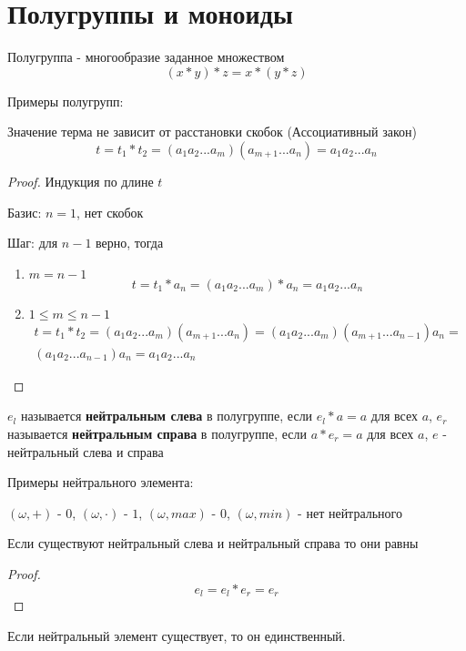 \documentclass[../main/document.tex]{subfiles}
\begin{document}
\section{Полугруппы и моноиды}
\begin{dfn}
Полугруппа - многообразие заданное множеством
$$(x*y)*z=x*(y*z)$$
\end{dfn}
\begin{exm}
Примеры полугрупп:
\end{exm}
\begin{thm}
Значение терма не зависит от расстановки скобок (Ассоциативный закон)
$$t=t_1*t_2=(a_{1}a_{2}...a_{m})(a_{m+1}...a_n)=a_{1}a_{2}...a_{n}$$
\begin{proof}
Индукция по длине $t$

Базис: $n=1$, нет скобок

Шаг: для $n-1$ верно, тогда
\begin{enumerate}
\item $m=n-1$
$$t=t_1*a_n=(a_{1}a_{2}...a_{m})*a_n=a_{1}a_{2}...a_{n}$$
\item $1\leq m\leq n-1$
\begin{multline*}
t=t_1*t_2=(a_{1}a_{2}...a_{m})(a_{m+1}...a_n)=(a_{1}a_{2}...a_{m})(a_{m+1}...a_{n-1})a_n=\\
(a_{1}a_{2}...a_{n-1})a_n=a_{1}a_{2}...a_{n}
\end{multline*}
\end{enumerate}
\end{proof}
\end{thm}
\begin{dfn}
$e_l$ называется \textbf{нейтральным слева} в полугруппе, если $e_l*a=a$ для всех $a$,
$e_r$ называется \textbf{нейтральным справа} в полугруппе, если $a*e_r=a$ для всех $a$,
$e$ - нейтральный слева и справа
\end{dfn}
\begin{exm}
Примеры нейтрального элемента:

$(\omega,+)$ - $0$, $(\omega,\cdot)$ - $1$, $(\omega,max)$ - $0$, $(\omega,min)$ - нет нейтрального
\end{exm}
\begin{thm}
Если существуют нейтральный слева и нейтральный справа то они равны
\begin{proof}
$$e_l=e_l*e_r=e_r$$
\end{proof}
\end{thm}
\begin{cnsq}
Если нейтральный элемент существует, то он единственный.
\end{cnsq}
\end{document}
